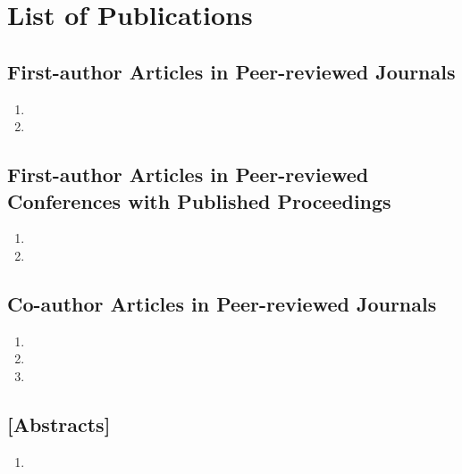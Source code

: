 \chapter{List of Publications}

\section*{First-author Articles in Peer-reviewed Journals} %
\label{sec:first_author_journal_articles}
\begin{enumerate}
    \item {}
    \item {} %
\end{enumerate}

\section*{First-author Articles in Peer-reviewed Conferences with Published Proceedings}
\label{sec:first_author_peer_reviewed_conference_papers}
\begin{enumerate}
    \item {}
    \item {}
\end{enumerate}

\section*{Co-author Articles in Peer-reviewed Journals} %
\label{sec:journal_articles}
\begin{enumerate}
    \item {}
    \item {}
    \item {}
\end{enumerate}

\section*{[Abstracts]} %
\label{sec:journal_articles}
\begin{enumerate}
    \item
\end{enumerate}
